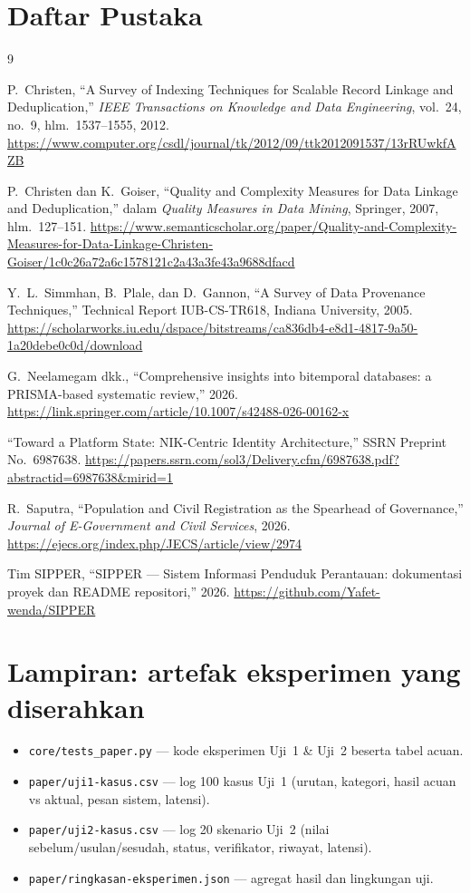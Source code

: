 \documentclass[11pt,a4paper]{article}
\begin{document}
\section*{Daftar Pustaka}
\begin{thebibliography}{9}

P.~Christen, ``A Survey of Indexing Techniques for Scalable Record Linkage and Deduplication,'' \emph{IEEE Transactions on Knowledge and Data Engineering}, vol.~24, no.~9, hlm.~1537--1555, 2012. \url{https://www.computer.org/csdl/journal/tk/2012/09/ttk2012091537/13rRUwkfAZB}

P.~Christen dan K.~Goiser, ``Quality and Complexity Measures for Data Linkage and Deduplication,'' dalam \emph{Quality Measures in Data Mining}, Springer, 2007, hlm.~127--151. \url{https://www.semanticscholar.org/paper/Quality-and-Complexity-Measures-for-Data-Linkage-Christen-Goiser/1c0c26a72a6c1578121c2a43a3fe43a9688dfacd}

Y.~L.~Simmhan, B.~Plale, dan D.~Gannon, ``A Survey of Data Provenance Techniques,'' Technical Report IUB-CS-TR618, Indiana University, 2005. \url{https://scholarworks.iu.edu/dspace/bitstreams/ca836db4-e8d1-4817-9a50-1a20debe0c0d/download}

G.~Neelamegam dkk., ``Comprehensive insights into bitemporal databases: a PRISMA-based systematic review,'' 2026. \url{https://link.springer.com/article/10.1007/s42488-026-00162-x}

``Toward a Platform State: NIK-Centric Identity Architecture,'' SSRN Preprint No.~6987638. \url{https://papers.ssrn.com/sol3/Delivery.cfm/6987638.pdf?abstractid=6987638&mirid=1}

R.~Saputra, ``Population and Civil Registration as the Spearhead of Governance,'' \emph{Journal of E-Government and Civil Services}, 2026. \url{https://ejecs.org/index.php/JECS/article/view/2974}

Tim SIPPER, ``SIPPER --- Sistem Informasi Penduduk Perantauan: dokumentasi proyek dan README repositori,'' 2026. \url{https://github.com/Yafet-wenda/SIPPER}

\end{thebibliography}

\section*{Lampiran: artefak eksperimen yang diserahkan}
\begin{itemize}\itemsep0.4em
\item \texttt{core/tests\_paper.py} --- kode eksperimen Uji~1 \& Uji~2 beserta tabel acuan.
\item \texttt{paper/uji1-kasus.csv} --- log 100 kasus Uji~1 (urutan, kategori, hasil acuan vs aktual, pesan sistem, latensi).
\item \texttt{paper/uji2-kasus.csv} --- log 20 skenario Uji~2 (nilai sebelum/usulan/sesudah, status, verifikator, riwayat, latensi).
\item \texttt{paper/ringkasan-eksperimen.json} --- agregat hasil dan lingkungan uji.
\end{itemize}
\end{document}
